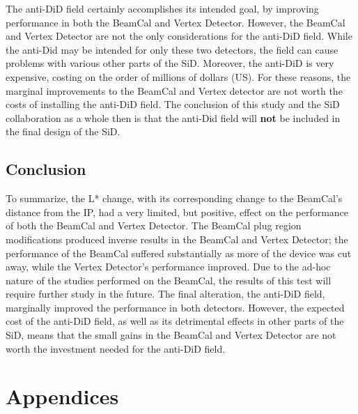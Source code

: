 \documentclass{report}
\begin{document}
                The anti-DiD field certainly accomplishes its intended goal, by improving performance in both the BeamCal and Vertex Detector. However, the BeamCal and Vertex Detector are not the only considerations for the anti-DiD field. While the anti-Did may be intended for only these two detectors, the field can cause problems with various other parts of the SiD. Moreover, the anti-DiD is very expensive, costing on the order of millions of dollars (US). For these reasons, the marginal improvements to the BeamCal and Vertex detector are not worth the costs of installing the anti-DiD field. The conclusion of this study and the SiD collaboration as a whole then is that the anti-Did field will \textbf{not} be included in the final design of the SiD.


        \section{Conclusion}
            To summarize, the L* change, with its corresponding change to the BeamCal's distance from the IP, had a very limited, but positive, effect on the performance of both the BeamCal and Vertex Detector. The BeamCal plug region modifications produced inverse results in the BeamCal and Vertex Detector; the performance of the BeamCal suffered substantially as more of the device was cut away, while the Vertex Detector's performance improved. Due to the ad-hoc nature of the studies performed on the BeamCal, the results of this test will require further study in the future. The final alteration, the anti-DiD field, marginally improved the performance in both detectors. However, the expected cost of the anti-DiD field, as well as its detrimental effects in other parts of the SiD, means that the small gains in the BeamCal and Vertex Detector are not worth the investment needed for the anti-DiD field.





    \chapter{Appendices}
\end{document}
